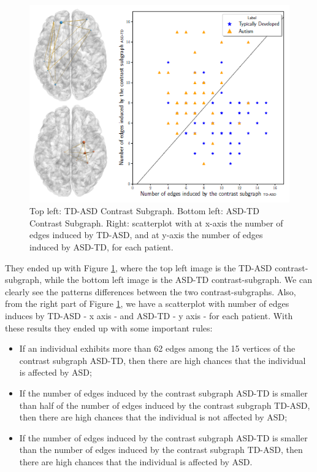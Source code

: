 \begin{figure}[htbp]
	\centering
	\includegraphics[scale=0.8]{Immagini/c-s1.PNG}
	\caption{Top left: TD-ASD Contrast Subgraph. Bottom left: ASD-TD Contrast Subgraph. Right: scatterplot with at x-axis the number of edges induced by TD-ASD, and at y-axis the number of edges induced by ASD-TD, for each patient.}
	\label{fig:diagram6}
\end{figure}
They ended up with Figure \ref{fig:diagram6}, where the top left image is the TD-ASD contrast-subgraph, while the bottom left image is the ASD-TD contrast-subgraph. We can clearly see the patterns differences between the two contrast-subgraphs. Also, from the right part of Figure \ref{fig:diagram6}, we have a scatterplot with number of edges induces by TD-ASD - x axis - and ASD-TD - y axis - for each patient. With these results they ended up with some important rules:
\begin{itemize}
	\item If an individual exhibits more than 62 edges among the 15 vertices of the contrast subgraph ASD-TD, then there are high chances that the individual is affected by ASD;
	\item If the number of edges induced by the contrast subgraph ASD-TD is smaller than half of the number of edges induced by the contrast subgraph TD-ASD, then there are high chances that the individual is not affected by ASD;
	\item If the number of edges induced by the contrast subgraph ASD-TD is smaller than the number of edges induced by the contrast subgraph TD-ASD, then there are high chances that the individual is affected by ASD.
\end{itemize}

